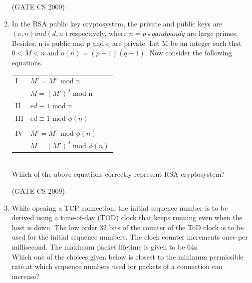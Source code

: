 \documentclass[a4paper, 11pt]{article}
\begin{document}
\begin{enumerate}
    \hfill (GATE CS 2009)

    \item In the RSA public key cryptosystem, the private and public keys are $(e, n) and (d, n)$respectively, where $n=p\star q and p and q$ are large primes. Besides, n is public and p and q are private. Let M be an integer such that $0<M<n$ and $o(n)=(p-1)(q-1)$. Now consider the following equations.\\
    \begin{tabular}{ll}
        I & $M' = M^e$  mod n\\
         & $M = (M')^d$ mod n\\
        II & $ed \equiv 1 $ mod n\\
        III & $ed \equiv 1 $ mod $\phi(n)$\\ \\
        IV & $M' = M^e$  mod $\phi(n)$\\
           & $M = (M')^d$  mod $\phi(n)$\\
    \end{tabular}\\
    Which of the above equations correctly represent RSA cryptosystem?

    \begin{enumerate}
    \end{enumerate}

    \hfill (GATE CS 2009)
    
     \item While opening a TCP connection, the initial sequence number is to be derived using a time-of-day (TOD) clock that keeps running even when the host is down. The low order 32 bits of the counter of the ToD clock is to be used for the initial sequence numbers. The clock counter increments once per millisecond. The maximum packet lifetime is given to be 64s.\\
    Which one of the choices given below is closest to the minimum permissible rate at which sequence numbers used for packets of a connection can increase?
    \begin{enumerate}
    \end{enumerate}
    

\end{enumerate}
\end{document}
